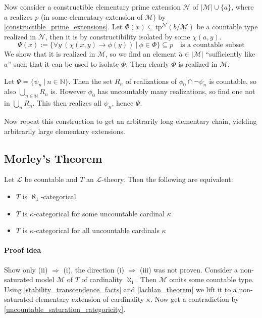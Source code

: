 \documentclass{scrartcl}
\newcommand{\N}{\mathbb{N}}
\begin{document}
Now consider a constructible elementary prime extension $\mathcal{N}$ of $|\mathcal{M}| \cup \{a\}$, where $a$ realizes $p$ (in some elementary extension of $\mathcal{M}$) by \ref{constructible_prime_extensions}.
Let $\Phi(x) \subseteq \mathrm{tp}^{\mathcal{N}}(b/\mathcal{M})$ be a countable type realized in $\mathcal{N}$, then it is by constructibility isolated by some $\chi(a, y)$.
\begin{equation*}
    \Psi(x) := \{ \forall y \ (\chi(x, y) \rightarrow \phi(y)) \ | \ \phi \in \Phi \} \subseteq p \quad \text{is a countable subset}
\end{equation*}
We show that it is realized in $\mathcal{M}$, so we find an element $\tilde{a} \in |\mathcal{M}|$ ``sufficiently like $a$'' such that it can be used to isolate $\Phi$.
Then clearly $\Phi$ is realized in $\mathcal{M}$. 

Let $\Psi = \{ \psi_n \ | \ n \in \N \}$. Then the set $R_n$ of realizations of $\phi_0 \cap \neg\psi_n$ is countable, so also $\bigcup_{n \in \N} R_n$ is.
However $\phi_0$ has uncountably many realizations, so find one not in $\bigcup_n R_n$. This then realizes all $\psi_n$, hence $\Psi$.

Now repeat this construction to get an arbitrarily long elementary chain, yielding arbitrarily large elementary extensions.

\subsection{Morley's Theorem}
Let $\mathcal{L}$ be countable and $T$ an $\mathcal{L}$-theory. Then the following are equivalent:
\begin{itemize}
    \item $T$ is $\aleph_1$-categorical
    \item $T$ is $\kappa$-categorical for some uncountable cardinal $\kappa$
    \item $T$ is $\kappa$-categorical for all uncountable cardinals $\kappa$
\end{itemize}
\paragraph{Proof idea} Show only (ii) $\Rightarrow$ (i), the direction (i) $\Rightarrow$ (iii) was not proven.
Consider a non-saturated model $\mathcal{M}$ of $T$ of cardinality $\aleph_1$. Then $\mathcal{M}$ omits some countable type.
Using \ref{stability_transcendence_facts} and \ref{lachlan_theorem} we lift it to a non-saturated elementary extension of cardinality $\kappa$.
Now get a contradiction by \ref{uncountable_saturation_categoricity}.
\end{document}
